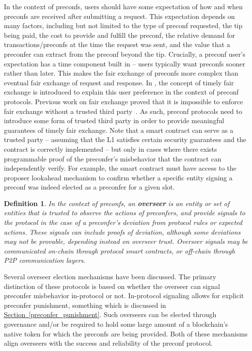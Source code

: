 \documentclass[a4paper]{article}
\theoremstyle{boldstyle}
\newtheorem{definitionx}{Definition}
\newenvironment{definition}
  {\begin{defopenboxq}\begin{definitionx}}
  {\end{definitionx}\end{defopenboxq}}
\begin{document}
    In the context of preconfs, users should have some expectation of how and when preconfs are received after submitting a request. This expectation depends on many factors, including but not limited to the type of preconf requested, the tip being paid, the cost to provide and fulfill the preconf, the relative demand for transactions/preconfs at the time the request was sent, and the value that a preconfer can extract from the preconf beyond the tip. Crucially, a preconf user's expectation has a time component built in -- users typically want preconfs sooner rather than later. This makes the fair exchange of preconfs more complex than eventual fair exchange of request and response. In \cite{W:PreconfirmationFairExchange}, the concept of timely fair exchange is introduced to explain this user preference in the context of preconf protocols. Previous work on fair exchange proved that it is impossible to enforce fair exchange without a trusted third party~\cite{P:OntheImpossibilityofFairExchangewithoutaTrustedThirdParty}. As such, preconf protocols need to introduce some form of trusted third party in order to provide meaningful guarantees of timely fair exchange. Note that a smart contract can serve as a trusted party -- assuming that the L1 satisfies certain security guarantees and the contract is correctly implemented -- but only in cases where there exists programmable proof of the preconfer’s misbehavior that the contract can independently verify. For example, the smart contract must have access to the proposer lookahead mechanism to confirm whether a specific entity signing a preconf was indeed elected as a preconfer for a given slot. 
    
    \begin{definition}
    \label{def:overseer}
    In the context of preconfs, an \textbf{overseer} is an entity or set of entities that is trusted to observe the actions of preconfers, and provide signals to the protocol in the case of a preconfer's deviation from protocol rules or expected actions. These signals can include proofs of deviation, although some deviations may not be provable, depending instead on overseer trust. Overseer signals may be communicated on-chain through protocol smart contracts, or off-chain through P2P communication layers.
    \end{definition}

    Several overseer election mechanisms have been discussed. The primary distinction of these protocols is based on whether the overseer can signal preconfer misbehavior in-protocol or not. In-protocol signaling allows for explicit preconfer punishment, something which is discussed in \hyperref[preconfer_punishment]{Section~\ref{preconfer_punishment}}.
    Such overseers can be elected through governance and/or be required to hold some large amount of a blockchain's native token for which the preconfs are being provided. Both of these mechanisms align overseers with the success and reliability of the preconf protocol. 
    
\end{document}
